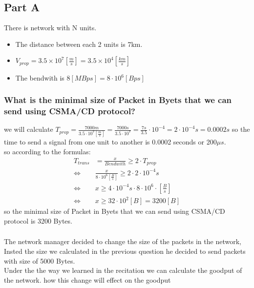 \documentclass{article}
\begin{document}
\subsection{Part A}
There is network with N units. 
\begin{itemize}
    \item The distance between each 2 units is 7km.
    \item $V_{prop} = 3.5\times 10^7[\frac{m}{s}]= 3.5 \times 10^{4} [\frac{km}{s}]$
    \item The bendwith is $8[MBps]= 8 \cdot 10^{6} [Bps]$ 
\end{itemize}
\subsubsection{What is the minimal size of Packet in Byets that we can send using CSMA/CD protocol?}
we will calculate $T_{prop} = \frac{7000m}{3.5\cdot 10^7 [\frac{m}{s}]}= \frac{7000s}{3.5\cdot 10^7}=\frac{7s}{3.5}\cdot 10^{-4} = 2\cdot 10^{-4} s = 0.0002 s$ so the time to send a signal from one unit to another is 0.0002 seconds or 200$\mu s$.\\
so according to the formulas:
\begin{equation}
    \begin{aligned}
        T_{trans} &= \frac{x}{Bendwith}\geq 2\cdot T_{prop}\\
        \iff & \frac{x}{8\cdot 10^6[\frac{B}{s}]} \geq 2\cdot 2\cdot 10^{-4}s\\
        \iff & x \geq 4\cdot 10^{-4}s \cdot 8 \cdot 10^6\cdot [\frac{B}{s}]\\
        \iff & x \geq 32 \cdot 10^2[B] = 3200 [B]
    \end{aligned}
\end{equation}
so the minimal size of Packet in Byets that we can send using CSMA/CD protocol is 3200 Bytes.

\subsubsection{}
The network manager decided to change the size of the packets in the network, Insted the size we calculated in the previous question he decided to send packets with size of 5000 Bytes.\\
Under the the way we learned in the recitation we can calculate the goodput of the network. how this change will effect on the goodput\\
\end{document}
